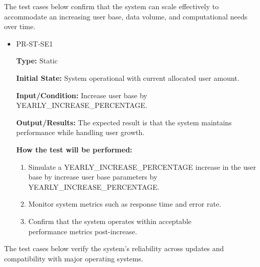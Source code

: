 \documentclass[12pt, titlepage]{article}
\begin{document}
\hspace{2em}The test cases below confirm that the system can scale effectively to 
accommodate an increasing user base, data volume, and computational needs over time. 

\begin{itemize}
  \item PR-ST-SE1
  \begin{mdframed}[linewidth=0.5mm]
      \textbf{Type:} Static \par
      \textbf{Initial State:} System operational with current allocated user amount. \par
      \textbf{Input/Condition:} Increase user base by YEARLY\_INCREASE\_PERCENTAGE. \par
      \textbf{Output/Results:} The expected result is that the system maintains performance while handling user growth. \par
      \textbf{How the test will be performed:}
      \begin{enumerate}[noitemsep]
        \item Simulate a YEARLY\_INCREASE\_PERCENTAGE increase in the user base by increase user base parameters by YEARLY\_INCREASE\_PERCENTAGE.
        \item Monitor system metrics such as response time and error rate.
        \item Confirm that the system operates within acceptable \\performance metrics post-increase.
      \end{enumerate}
  \end{mdframed}
\end{itemize}

\hspace{2em}The test cases below verify the system’s reliability across updates and 
compatibility with major operating systems. 
\end{document}
